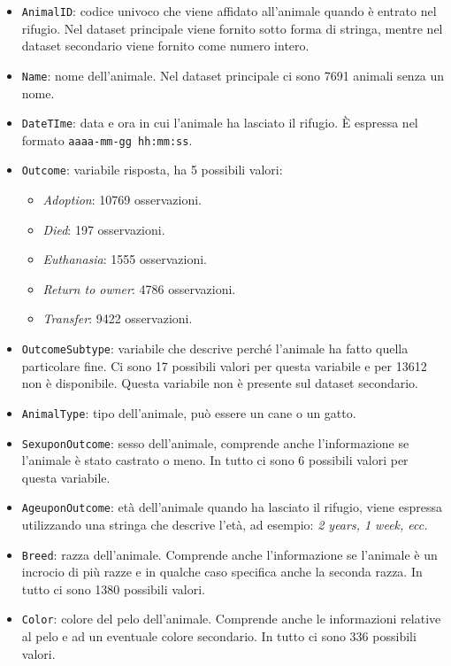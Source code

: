 \begin{itemize}
	\item \texttt{AnimalID}: codice univoco che viene affidato all'animale quando è entrato nel rifugio. Nel dataset principale viene fornito sotto forma di stringa, mentre nel dataset secondario viene fornito come numero intero.
	\item \texttt{Name}: nome dell'animale. Nel dataset principale ci sono 7691 animali senza un nome.
	\item \texttt{DateTIme}: data e ora in cui l'animale ha lasciato il rifugio. \`{E} espressa nel formato \texttt{aaaa-mm-gg hh:mm:ss}.
	\item \texttt{Outcome}: variabile risposta, ha 5 possibili valori:
		\begin{itemize}
			\item \textit{Adoption}: 10769 osservazioni.
			\item \textit{Died}: 197 osservazioni.
			\item \textit{Euthanasia}: 1555 osservazioni.
			\item \textit{Return to owner}: 4786 osservazioni.
			\item \textit{Transfer}: 9422 osservazioni.
		\end{itemize}
	\item \texttt{OutcomeSubtype}: variabile che descrive perché l'animale ha fatto quella particolare fine. Ci sono 17 possibili valori per questa variabile e per 13612 non è disponibile. Questa variabile non è presente sul dataset secondario.
	\item \texttt{AnimalType}: tipo dell'animale, può essere un cane o un gatto.
	\item \texttt{SexuponOutcome}: sesso dell'animale, comprende anche l'informazione se l'animale è stato castrato o meno. In tutto ci sono 6 possibili valori per questa variabile.
	\item \texttt{AgeuponOutcome}: età dell'animale quando ha lasciato il rifugio, viene espressa utilizzando una stringa che descrive l'età, ad esempio: \textit{2 years, 1 week, ecc.}
	\item \texttt{Breed}: razza dell'animale. Comprende anche l'informazione se l'animale è un incrocio di più razze e in qualche caso specifica anche la seconda razza. In tutto ci sono 1380 possibili valori.
	\item \texttt{Color}: colore del pelo dell'animale. Comprende anche le informazioni relative al pelo e ad un eventuale colore secondario. In tutto ci sono 336 possibili valori.
\end{itemize}

